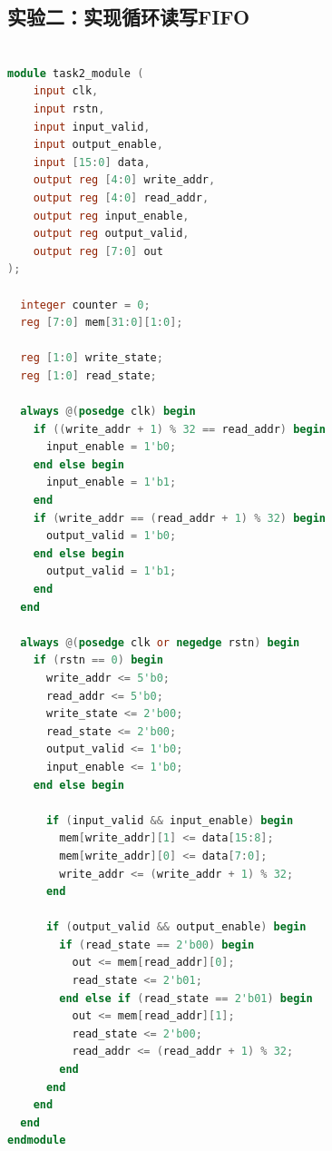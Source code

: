\documentclass[zihao=5, UTF8]{article}
\theoremstyle{MyLineTheoremStyle} %
\theoremstyle{MyBlockTheoremStyle} %
\theoremstyle{MySubsubsectionStyle} %
\begin{document}
\subsection{实验二：实现循环读写FIFO}
\begin{lstlisting}[language=Verilog]

module task2_module (
    input clk,
    input rstn,
    input input_valid,
    input output_enable,
    input [15:0] data,
    output reg [4:0] write_addr,
    output reg [4:0] read_addr,
    output reg input_enable,
    output reg output_valid,
    output reg [7:0] out
);

  integer counter = 0;
  reg [7:0] mem[31:0][1:0];

  reg [1:0] write_state;
  reg [1:0] read_state;

  always @(posedge clk) begin
    if ((write_addr + 1) % 32 == read_addr) begin
      input_enable = 1'b0;
    end else begin
      input_enable = 1'b1;
    end
    if (write_addr == (read_addr + 1) % 32) begin
      output_valid = 1'b0;
    end else begin
      output_valid = 1'b1;
    end
  end

  always @(posedge clk or negedge rstn) begin
    if (rstn == 0) begin
      write_addr <= 5'b0;
      read_addr <= 5'b0;
      write_state <= 2'b00;
      read_state <= 2'b00;
      output_valid <= 1'b0;
      input_enable <= 1'b0;
    end else begin

      if (input_valid && input_enable) begin
        mem[write_addr][1] <= data[15:8];
        mem[write_addr][0] <= data[7:0];
        write_addr <= (write_addr + 1) % 32;
      end

      if (output_valid && output_enable) begin
        if (read_state == 2'b00) begin
          out <= mem[read_addr][0];
          read_state <= 2'b01;
        end else if (read_state == 2'b01) begin
          out <= mem[read_addr][1];
          read_state <= 2'b00;
          read_addr <= (read_addr + 1) % 32;
        end
      end
    end
  end
endmodule
\end{lstlisting}
\end{document}
